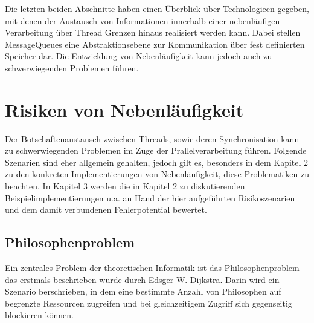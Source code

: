 \documentclass[12pt,oneside,a4paper,bibtotoc,liststotoc]{scrreprt}
\begin{document}
Die letzten beiden Abschnitte haben einen Überblick über Technologieen gegeben, mit denen der Austausch von Informationen innerhalb einer nebenläufigen Verarbeitung über Thread Grenzen hinaus realisiert werden kann. Dabei stellen MessageQueues eine Abstraktionsebene zur Kommunikation über fest definierten Speicher dar. Die Entwicklung von Nebenläufigkeit kann jedoch auch zu schwerwiegenden Problemen führen.


\section{Risiken von Nebenläufigkeit}
Der Botschaftenaustausch zwischen Threads, sowie deren Synchronisation kann zu schwerwiegenden Problemen im Zuge der Prallelverarbeitung führen. Folgende Szenarien sind eher allgemein gehalten, jedoch gilt es, besonders in dem Kapitel 2  zu den konkreten Implementierungen von Nebenläufigkeit, diese Problematiken zu beachten. In Kapitel 3 werden die in Kapitel 2 zu diskutierenden Beispielimplementierungen u.a. an Hand der hier aufgeführten Risikoszenarien und dem damit verbundenen Fehlerpotential bewertet.


\subsection{Philosophenproblem}
Ein zentrales Problem der theoretischen Informatik ist das Philosophenproblem das erstmals beschrieben wurde durch Edsger W. Dijkstra. Darin wird ein Szenario berschrieben, in dem eine bestimmte Anzahl von Philosophen auf begrenzte Ressourcen zugreifen und bei gleichzeitigem Zugriff sich gegenseitig blockieren können.
\end{document}
